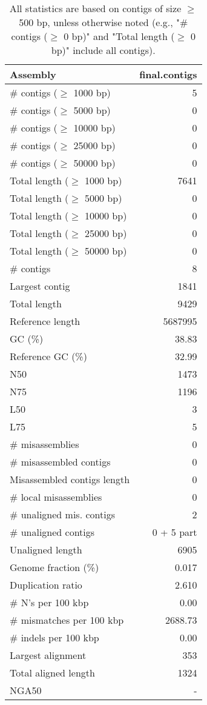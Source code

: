 \documentclass[12pt,a4paper]{article}
\begin{document}
\begin{table}[ht]
\begin{center}
\caption{All statistics are based on contigs of size $\geq$ 500 bp, unless otherwise noted (e.g., "\# contigs ($\geq$ 0 bp)" and "Total length ($\geq$ 0 bp)" include all contigs).}
\begin{tabular}{|l*{1}{|r}|}
\hline
Assembly & final.contigs \\ \hline
\# contigs ($\geq$ 1000 bp) & 5 \\ \hline
\# contigs ($\geq$ 5000 bp) & 0 \\ \hline
\# contigs ($\geq$ 10000 bp) & 0 \\ \hline
\# contigs ($\geq$ 25000 bp) & 0 \\ \hline
\# contigs ($\geq$ 50000 bp) & 0 \\ \hline
Total length ($\geq$ 1000 bp) & 7641 \\ \hline
Total length ($\geq$ 5000 bp) & 0 \\ \hline
Total length ($\geq$ 10000 bp) & 0 \\ \hline
Total length ($\geq$ 25000 bp) & 0 \\ \hline
Total length ($\geq$ 50000 bp) & 0 \\ \hline
\# contigs & 8 \\ \hline
Largest contig & 1841 \\ \hline
Total length & 9429 \\ \hline
Reference length & 5687995 \\ \hline
GC (\%) & 38.83 \\ \hline
Reference GC (\%) & 32.99 \\ \hline
N50 & 1473 \\ \hline
N75 & 1196 \\ \hline
L50 & 3 \\ \hline
L75 & 5 \\ \hline
\# misassemblies & 0 \\ \hline
\# misassembled contigs & 0 \\ \hline
Misassembled contigs length & 0 \\ \hline
\# local misassemblies & 0 \\ \hline
\# unaligned mis. contigs & 2 \\ \hline
\# unaligned contigs & 0 + 5 part \\ \hline
Unaligned length & 6905 \\ \hline
Genome fraction (\%) & 0.017 \\ \hline
Duplication ratio & 2.610 \\ \hline
\# N's per 100 kbp & 0.00 \\ \hline
\# mismatches per 100 kbp & 2688.73 \\ \hline
\# indels per 100 kbp & 0.00 \\ \hline
Largest alignment & 353 \\ \hline
Total aligned length & 1324 \\ \hline
NGA50 & - \\ \hline
\end{tabular}
\end{center}
\end{table}
\end{document}
